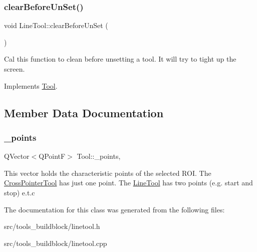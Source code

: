 \subsubsection{\texorpdfstring{clear\+Before\+Un\+Set()}{clearBeforeUnSet()}}
{\footnotesize\ttfamily void Line\+Tool\+::clear\+Before\+Un\+Set (\begin{DoxyParamCaption}{ }\end{DoxyParamCaption})\hspace{0.3cm}{\ttfamily [virtual]}}

Cal this function to clean before unsetting a tool. It will try to tight up the screen. 

Implements \mbox{\hyperlink{classTool_a7d9e7d03f4a34d71850cbbfc16ca8532}{Tool}}.



\subsection{Member Data Documentation}
\mbox{\label{classTool_a68be77a2e364a7b13d7206388ba5843e}} 
\subsubsection{\texorpdfstring{\+\_\+points}{\_points}}
{\footnotesize\ttfamily Q\+Vector$<$Q\+PointF$>$ Tool\+::\+\_\+points\hspace{0.3cm}{\ttfamily [protected]}, {\ttfamily [inherited]}}

This vector holds the characteristic points of the selected R\+OI. The \mbox{\hyperlink{classCrossPointerTool}{Cross\+Pointer\+Tool}} has just one point. The \mbox{\hyperlink{classLineTool}{Line\+Tool}} has two points (e.\+g. start and stop) e.\+t.\+c 

The documentation for this class was generated from the following files\+:\begin{DoxyCompactItemize}
\item 
src/tools\+\_\+buildblock/linetool.\+h\item 
src/tools\+\_\+buildblock/linetool.\+cpp\end{DoxyCompactItemize}
